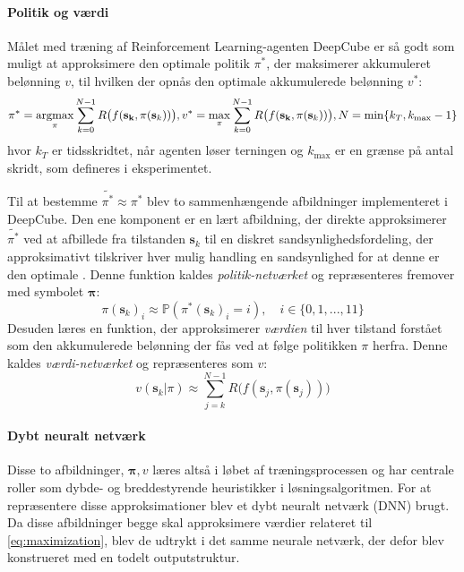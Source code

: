 \documentclass[../main.tex]{subfiles}
\begin{document}
\paragraph{Politik og værdi} Målet med træning af Reinforcement Learning-agenten DeepCube er så godt som muligt at approksimere den optimale politik \(\pi^*\), der maksimerer akkumuleret belønning \(v\), til hvilken der opnås den optimale akkumulerede belønning \(v^*\):
\begin{equation}\label{eq:maximization}
	\pi^* = \operatorname*{argmax}_{\pi}\sum_{k=0}^{N-1} R\big(f(\mathbf{s_k},\pi(\mathbf s_k))\big),
	v^* = \operatorname*{max}_\pi\sum_{k=0}^{N-1} R\big(f(\mathbf{s_k},\pi(\mathbf s_k))\big),
	N = \operatorname{min}\{k_T, k_{\text{max}}-1\}
\end{equation}
hvor \(k_T\) er tidsskridtet, når agenten løser terningen og \(k_{\text{max}}\) er en grænse på antal skridt,  som defineres i eksperimentet. 

Til at bestemme \(\widetilde {\pi ^*} \approx 	\pi^*\) blev to sammenhængende afbildninger implementeret i DeepCube. Den ene komponent er en lært afbildning, der direkte approksimerer \(\widetilde {\pi ^*}\) ved at afbillede fra tilstanden \(\mathbf s_k\) til en diskret sandsynlighedsfordeling, der approksimativt tilskriver hver mulig handling en sandsynlighed for at denne er den optimale . Denne funktion kaldes \textit{politik-netværket} og repræsenteres fremover med symbolet \(\bm \pi\):
\[
\pi(\mathbf s_k)_i \approx \mathbb P (\pi^*(\mathbf s_k)_i = i ),\quad i \in \{0,1, ..., 11\}
\]
Desuden læres en funktion, der approksimerer \textit{værdien} til hver tilstand forstået som den akkumulerede belønning der fås ved at følge politikken \(\pi\) herfra. Denne kaldes \textit{værdi-netværket} og repræsenteres som \(v\):
\[
v(\mathbf s_k| \pi) \approx \sum_{j=k}^{N-1} R\big(f(\mathbf s_j,\pi(\mathbf s_j))\big)
\]
\paragraph{Dybt neuralt netværk} Disse to afbildninger, \(\bm \pi, v\) læres altså i løbet af træningsprocessen og har centrale roller som dybde- og breddestyrende heuristikker i  løsningsalgoritmen. For at repræsentere disse approksimationer blev et dybt neuralt netværk (DNN) brugt. Da disse afbildninger begge skal approksimere værdier relateret til  \eqref{eq:maximization}, blev de udtrykt i det samme neurale netværk, der defor blev konstrueret med en todelt outputstruktur. 
\end{document}
